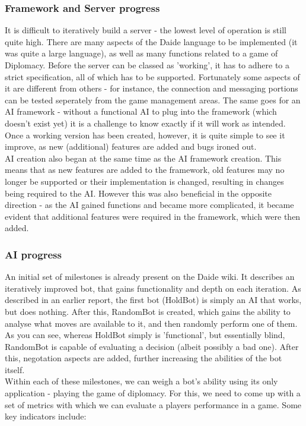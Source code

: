 \documentclass[12pt]{article}
\begin{document}
\subsubsection{Framework and Server progress}
It is difficult to iteratively build a server - the lowest level of operation is still quite high. There are many aspects of the Daide language to be implemented (it was quite a large language), as well as many functions related to a game of Diplomacy. Before the server can be classed as 'working', it has to adhere to a strict specification, all of which has to be supported. Fortunately some aspects of it are different from others - for instance, the connection and messaging portions can be tested seperately from the game management areas. The same goes for an AI framework - without a functional AI to plug into the framework (which doesn't exist yet) it is a challenge to know exactly if it will work as intended. Once a working version has been created, however, it is quite simple to see it improve, as new (additional) features are added and bugs ironed out.
\\
AI creation also began at the same time as the AI framework creation. This means that as new features are added to the framework, old features may no longer be supported or their implementation is changed, resulting in changes being required to the AI. However this was also beneficial in the opposite direction - as the AI gained functions and became more complicated, it became evident that additional features were required in the framework, which were then added.

\subsubsection{AI progress}
An initial set of milestones is already present on the Daide wiki. It describes an iteratively improved bot, that gains functionality and depth on each iteration. As described in an earlier report, the first bot (HoldBot) is simply an AI that works, but does nothing. After this, RandomBot is created, which gains the ability to analyse what moves are available to it, and then randomly perform one of them. As you can see, whereas HoldBot simply is 'functional', but essentially blind, RandomBot is capable of evaluating a decision (albeit possibly a bad one). After this, negotation aspects are added, further increasing the abilities of the bot itself. 
\\
Within each of these milestones, we can weigh a bot's ability using its only application - playing the game of diplomacy. For this, we need to come up with a set of metrics with which we can evaluate a players performance in a game. Some key indicators include:
\end{document}

